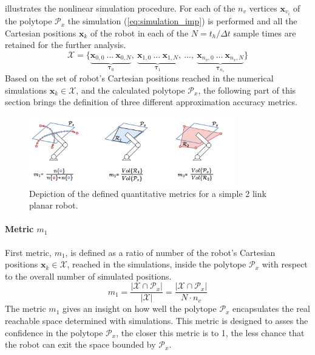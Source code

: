  illustrates the nonlinear simulation procedure. For each of the $n_v$ vertices $\bm{x}_{v_i}$ of the polytope $\mathcal{P}_x$ the simulation (\ref{eq:simulation_imp}) is performed and all the Cartesian positions $\bm{x}_k$ of the robot in each of the $N=t_h/\Delta t$ sample times are retained for the further analysis. $$
\mathcal{X} = \{\underbrace{\bm{x}_{0,0}~\dots ~\bm{x}_{0,N}}_{\bm{\tau}_0},~\underbrace{\bm{x}_{1,0}~\dots~\bm{x}_{1,N}}_{\bm{\tau}_1},~\dots, ~ \underbrace{\bm{x}_{n_v,0}~\dots~\bm{x}_{n_v,N}}_{\bm{\tau}_{n_v}}\}
$$
Based on the set of robot's Cartesian positions reached in the numerical simulations $\bm{x}_k\in \mathcal{X}$, and the calculated polytope $\mathcal{P}_x$, the following part of this section brings the definition of three different approximation accuracy metrics.

\begin{figure}[!t]
    \centering
    \includegraphics[width=0.8\textwidth]{Papers/images/metrics.pdf}
    \caption{Depiction of the defined quantitative metrics for a simple 2 link planar robot. }
    \label{fig:metrics_defintition}

\end{figure}

\paragraph*{Metric $m_1$} First metric, $m_1$, is defined as a ratio of number of the robot's Cartesian positions $\bm{x}_k\in \mathcal{X}$, reached in the simulations, inside the polytope $\mathcal{P}_x$ with respect to the overall number of simulated positions. 
\begin{equation}
    m_1 = \frac{|\mathcal{X}\cap\mathcal{P}_x|}{|\mathcal{X}|} = \frac{|\mathcal{X}\cap\mathcal{P}_x|}{N\cdot n_v}
\end{equation}
The metric $m_1$ gives an insight on how well the polytope $\mathcal{P}_x$ encapsulates the real reachable space determined with simulations. This metric is designed to asses the confidence in the polytope $\mathcal{P}_x$, the closer this metric is to 1, the less chance that the robot can exit the space bounded by $\mathcal{P}_x$.

